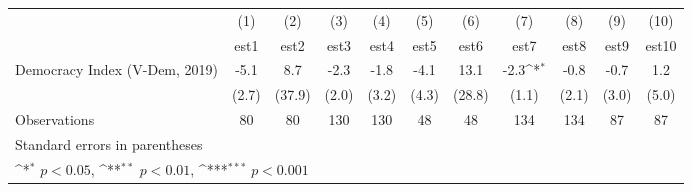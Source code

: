 {
\def\sym#1{\ifmmode^{#1}\else\(^{#1}\)\fi}
\begin{tabular}{l*{10}{c}}
\hline\hline
                    &\multicolumn{1}{c}{(1)}         &\multicolumn{1}{c}{(2)}         &\multicolumn{1}{c}{(3)}         &\multicolumn{1}{c}{(4)}         &\multicolumn{1}{c}{(5)}         &\multicolumn{1}{c}{(6)}         &\multicolumn{1}{c}{(7)}         &\multicolumn{1}{c}{(8)}         &\multicolumn{1}{c}{(9)}         &\multicolumn{1}{c}{(10)}         \\
                    &        est1         &        est2         &        est3         &        est4         &        est5         &        est6         &        est7         &        est8         &        est9         &       est10         \\
\hline
Democracy Index (V-Dem, 2019)&        -5.1         &         8.7         &        -2.3         &        -1.8         &        -4.1         &        13.1         &        -2.3\sym{*}  &        -0.8         &        -0.7         &         1.2         \\
                    &       (2.7)         &      (37.9)         &       (2.0)         &       (3.2)         &       (4.3)         &      (28.8)         &       (1.1)         &       (2.1)         &       (3.0)         &       (5.0)         \\
\hline
Observations        &          80         &          80         &         130         &         130         &          48         &          48         &         134         &         134         &          87         &          87         \\
\hline\hline
\multicolumn{11}{l}{\footnotesize Standard errors in parentheses}\\
\multicolumn{11}{l}{\footnotesize \sym{*} \(p<0.05\), \sym{**} \(p<0.01\), \sym{***} \(p<0.001\)}\\
\end{tabular}
}
